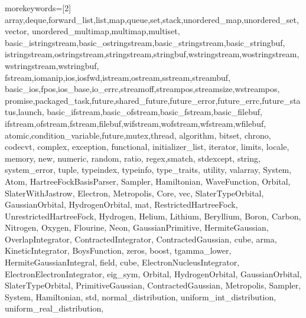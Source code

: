 {
    morekeywords=[2]{
        array,deque,forward_list,list,map,queue,set,stack,unordered_map,unordered_set,vector,
        unordered_multimap,multimap,multiset,
        basic_istringstream,basic_ostringstream,basic_stringstream,basic_stringbuf,
        istringstream,ostringstream,stringstream,stringbuf,wstringstream,wostringstream,wstringstream,wstringbuf,
        fstream,iomanip,ios,iosfwd,istream,ostream,sstream,streambuf,
        basic_ios,fpos,ios_base,io_errc,streamoff,streampos,streamsize,wstreampos,
        promise,packaged_task,future,shared_future,future_error,future_errc,future_status,launch,
        basic_ifstream,basic_ofstream,basic_fstream,basic_filebuf,
        ifstream,ofstream,fstream,filebuf,wifstream,wofstream,wfstream,wfilebuf,
        atomic,condition_variable,future,mutex,thread,
        algorithm,
        bitset,
        chrono,
        codecvt,
        complex,
        exception,
        functional,
        initializer_list,
        iterator,
        limits,
        locale,
        memory,
        new,
        numeric,
        random,
        ratio,
        regex,smatch,
        stdexcept,
        string,
        system_error,
        tuple,
        typeindex,
        typeinfo,
        type_traits,
        utility,
        valarray,
        System,
        Atom,
        HartreeFockBasisParser,
        Sampler,
        Hamiltonian,
        WaveFunction,
        Orbital,
        SlaterWithJastrow,
        Electron,
        Metropolis,
        Core,
        vec,
        SlaterTypeOrbital,
        GaussianOrbital,
        HydrogenOrbital,
        mat,
        RestrictedHartreeFock,
        UnrestrictedHartreeFock,
        Hydrogen,
        Helium,
        Lithium,
        Beryllium,
        Boron,
        Carbon,
        Nitrogen,
        Oxygen,
        Flourine,
        Neon,
        GaussianPrimitive,
        HermiteGaussian,
        OverlapIntegrator,
        ContractedIntegrator,
        ContractedGaussian,
        cube,
        arma,
        KineticIntegrator,
        BoysFunction,
        zeros,
        boost,
        tgamma_lower,
        HermiteGaussianIntegral,
        field,
        cube,
        ElectronNucleusIntegrator,
        ElectronElectronIntegrator,
        eig_sym,
        Orbital,
        HydrogenOrbital,
        GaussianOrbital,
        SlaterTypeOrbital,
        PrimitiveGaussian,
        ContractedGaussian,
        Metropolis,
        Sampler,
        System,
        Hamiltonian,
        std,
        normal_distribution,
        uniform_int_distribution,
        uniform_real_distribution,
}}
